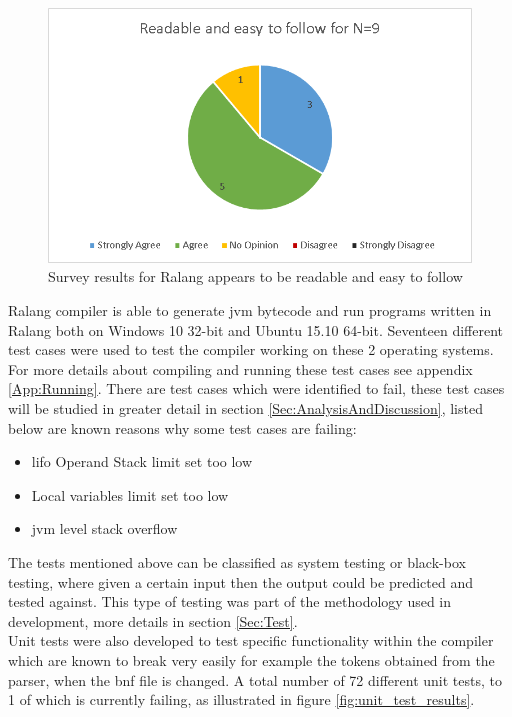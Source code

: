 \documentclass[a4paper]{article}
\begin{document}
	\begin{figure}[h!]
		\centering
		\includegraphics[width=0.9\linewidth]{images/survey_results_1.png}
		\caption[Survey results for Ralang appears to be readable and easy to follow]{Survey results for Ralang appears to be readable and easy to follow}
		\label{fig:survey_results_1}
	\end{figure}
	Ralang compiler is able to generate \ac{jvm} bytecode and run programs written in Ralang both on Windows 10 32-bit and Ubuntu 15.10 64-bit. Seventeen different test cases were used to test the compiler working on these 2 operating systems. For more details about compiling and running these test cases see appendix \ref{App:Running}. There are test cases which were identified to fail, these test cases will be studied in greater detail in section \ref{Sec:AnalysisAndDiscussion}, listed below are known reasons why some test cases are failing:
	\begin{itemize}
		\item \ac{lifo} Operand Stack limit set too low
		\item Local variables limit set too low
		\item \ac{jvm} level stack overflow
	\end{itemize}
	The tests mentioned above can be classified as system testing or black-box testing, where given a certain input then the output could be predicted and tested against. This type of testing was part of the methodology used in development, more details in section \ref{Sec:Test}.\\
	
	Unit tests were also developed to test specific functionality within the compiler which are known to break very easily for example the tokens obtained from the parser, when the \ac{bnf} file is changed. A total number of 72 different unit tests, to 1 of which is currently failing, as illustrated in figure \ref{fig:unit_test_results}.\\
	
\end{document}
